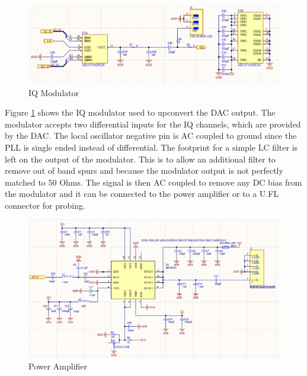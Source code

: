 \documentclass[crop=false]{standalone}
\begin{document}
        \newpage
        
        \begin{figure}[H]
            \centering
            \includegraphics[width=\textwidth]{M2RBIQMod.PNG}
            \caption{IQ Modulator}
            \label{fig:M2RBIQMod}
        \end{figure}
        
        Figure \ref{fig:M2RBIQMod} shows the IQ modulator used to upconvert the DAC output. The modulator accepts two differential inputs for the IQ channels, which are provided by the DAC. The local oscillator negative pin is AC coupled to ground since the PLL is single ended instead of differential. The footprint for a simple LC filter is left on the output of the modulator. This is to allow an additional filter to remove out of band spurs and because the modulator output is not perfectly matched to 50 Ohms. The signal is then AC coupled to remove any DC bias from the modulator and it can be connected to the power amplifier or to a U.FL connector for probing.
            
        \begin{figure}[H]
            \centering
            \includegraphics[width=\textwidth]{LMSPowerAmp.PNG}
            \caption{Power Amplifier}
            \label{fig:LMSPowerAmp}
        \end{figure}
            
\end{document}
